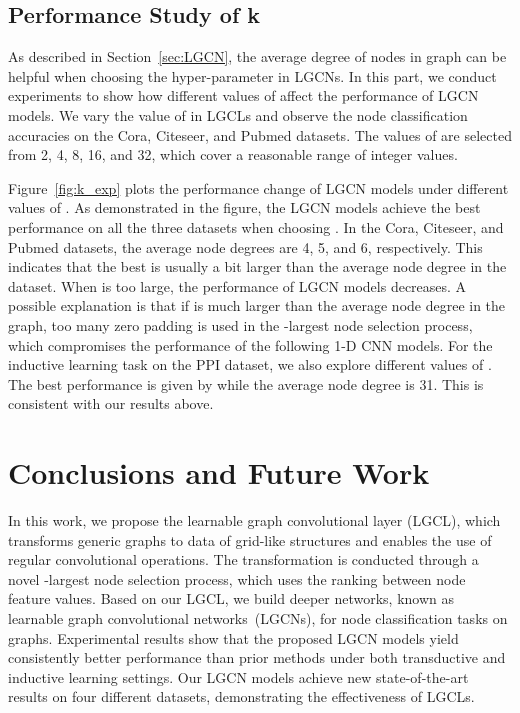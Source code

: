 \documentclass[sigconf]{acmart}
\begin{document}
\subsection{Performance Study of k}

As described in Section~\ref{sec:LGCN}, the average degree of nodes
in graph can be helpful when choosing the hyper-parameter  in
LGCNs. In this part, we conduct experiments to show how different
values of  affect the performance of LGCN models. We vary the
value of  in LGCLs and observe the node classification accuracies
on the Cora, Citeseer, and Pubmed datasets. The values of  are
selected from 2, 4, 8, 16, and 32, which cover a reasonable range of
integer values.


Figure~\ref{fig:k_exp} plots the performance change of LGCN models
under different values of . As demonstrated in the figure, the
LGCN models achieve the best performance on all the three datasets
when choosing . In the Cora, Citeseer, and Pubmed datasets, the
average node degrees are 4, 5, and 6, respectively. This indicates
that the best  is usually a bit larger than the average node
degree in the dataset. When  is too large, the performance of
LGCN models decreases. A possible explanation is that if  is much
larger than the average node degree in the graph, too many zero
padding is used in the -largest node selection process, which
compromises the performance of the following 1-D CNN models. For the
inductive learning task on the PPI dataset, we also explore
different values of . The best performance is given by 
while the average node degree is 31. This is consistent with our
results above.


\section{Conclusions and Future Work}


In this work, we propose the learnable graph convolutional layer
(LGCL), which transforms generic graphs to data of grid-like
structures and enables the use of regular convolutional operations.
The transformation is conducted through a novel -largest node
selection process, which uses the ranking between node feature
values. Based on our LGCL, we build deeper networks, known as
learnable graph convolutional networks~(LGCNs), for node
classification tasks on graphs. Experimental results show that the
proposed LGCN models yield consistently better performance than
prior methods under both transductive and inductive learning
settings. Our LGCN models achieve new state-of-the-art results on
four different datasets, demonstrating the effectiveness of LGCLs.
\end{document}
